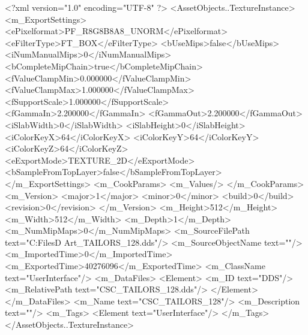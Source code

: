 <?xml version="1.0" encoding="UTF-8" ?>
<AssetObjects..TextureInstance>
	<m_ExportSettings>
		<ePixelformat>PF_R8G8B8A8_UNORM</ePixelformat>
		<eFilterType>FT_BOX</eFilterType>
		<bUseMips>false</bUseMips>
		<iNumManualMips>0</iNumManualMips>
		<bCompleteMipChain>true</bCompleteMipChain>
		<fValueClampMin>0.000000</fValueClampMin>
		<fValueClampMax>1.000000</fValueClampMax>
		<fSupportScale>1.000000</fSupportScale>
		<fGammaIn>2.200000</fGammaIn>
		<fGammaOut>2.200000</fGammaOut>
		<iSlabWidth>0</iSlabWidth>
		<iSlabHeight>0</iSlabHeight>
		<iColorKeyX>64</iColorKeyX>
		<iColorKeyY>64</iColorKeyY>
		<iColorKeyZ>64</iColorKeyZ>
		<eExportMode>TEXTURE_2D</eExportMode>
		<bSampleFromTopLayer>false</bSampleFromTopLayer>
	</m_ExportSettings>
	<m_CookParams>
		<m_Values/>
	</m_CookParams>
	<m_Version>
		<major>1</major>
		<minor>0</minor>
		<build>0</build>
		<revision>0</revision>
	</m_Version>
	<m_Height>512</m_Height>
	<m_Width>512</m_Width>
	<m_Depth>1</m_Depth>
	<m_NumMipMaps>0</m_NumMipMaps>
	<m_SourceFilePath text="C:\Users\Shadow\Desktop\Working Files\2D Art\Quarters\Tailors\CSC_TAILORS_128.dds"/>
	<m_SourceObjectName text=""/>
	<m_ImportedTime>0</m_ImportedTime>
	<m_ExportedTime>40276096</m_ExportedTime>
	<m_ClassName text="UserInterface"/>
	<m_DataFiles>
		<Element>
			<m_ID text="DDS"/>
			<m_RelativePath text="CSC_TAILORS_128.dds"/>
		</Element>
	</m_DataFiles>
	<m_Name text="CSC_TAILORS_128"/>
	<m_Description text=""/>
	<m_Tags>
		<Element text="UserInterface"/>
	</m_Tags>
</AssetObjects..TextureInstance>

